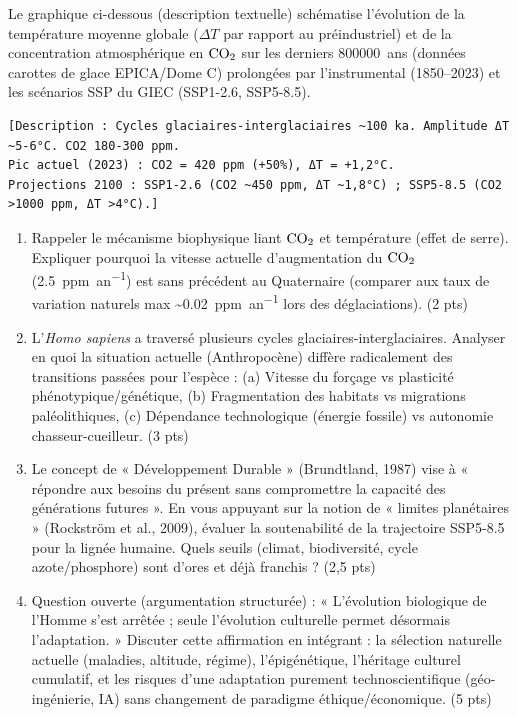 \documentclass[11pt]{article}
\begin{document}
\begin{exercice}
Le graphique ci-dessous (description textuelle) schématise l'évolution de la température moyenne globale ($\Delta T$ par rapport au préindustriel) et de la concentration atmosphérique en $\ce{CO2}$ sur les derniers \SI{800000}{ans} (données carottes de glace EPICA/Dome C) prolongées par l'instrumental (1850--2023) et les scénarios SSP du GIEC (SSP1-2.6, SSP5-8.5).

\begin{verbatim}
[Description : Cycles glaciaires-interglaciaires ~100 ka. Amplitude ΔT ~5-6°C. CO2 180-300 ppm.
Pic actuel (2023) : CO2 = 420 ppm (+50%), ΔT = +1,2°C.
Projections 2100 : SSP1-2.6 (CO2 ~450 ppm, ΔT ~1,8°C) ; SSP5-8.5 (CO2 >1000 ppm, ΔT >4°C).]
\end{verbatim}

\begin{enumerate}
    \item Rappeler le mécanisme biophysique liant $\ce{CO2}$ et température (effet de serre). Expliquer pourquoi la vitesse actuelle d'augmentation du $\ce{CO2}$ (\SI{2,5}{ppm.an^{-1}}) est sans précédent au Quaternaire (comparer aux taux de variation naturels max \textasciitilde \SI{0,02}{ppm.an^{-1}} lors des déglaciations). (2 pts)
    \item L'\textit{Homo sapiens} a traversé plusieurs cycles glaciaires-interglaciaires. Analyser en quoi la situation actuelle (Anthropocène) diffère radicalement des transitions passées pour l'espèce : (a) Vitesse du forçage vs plasticité phénotypique/génétique, (b) Fragmentation des habitats vs migrations paléolithiques, (c) Dépendance technologique (énergie fossile) vs autonomie chasseur-cueilleur. (3 pts)
    \item Le concept de « Développement Durable » (Brundtland, 1987) vise à « répondre aux besoins du présent sans compromettre la capacité des générations futures ». En vous appuyant sur la notion de « limites planétaires » (Rockström et al., 2009), évaluer la soutenabilité de la trajectoire SSP5-8.5 pour la lignée humaine. Quels seuils (climat, biodiversité, cycle azote/phosphore) sont d'ores et déjà franchis ? (2,5 pts)
    \item Question ouverte (argumentation structurée) : « L'évolution biologique de l'Homme s'est arrêtée ; seule l'évolution culturelle permet désormais l'adaptation. » Discuter cette affirmation en intégrant : la sélection naturelle actuelle (maladies, altitude, régime), l'épigénétique, l'héritage culturel cumulatif, et les risques d'une adaptation purement technoscientifique (géo-ingénierie, IA) sans changement de paradigme éthique/économique. (5 pts)
\end{enumerate}
\end{exercice}
\end{document}
